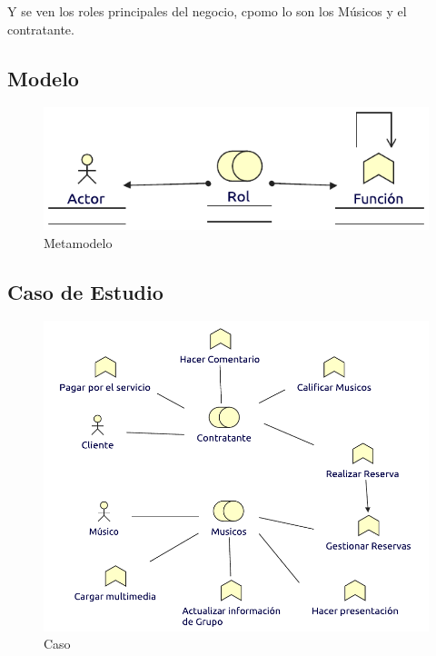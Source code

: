 Y se ven los roles principales del negocio, cpomo lo son los Músicos y el contratante. 

\subsection{Modelo}
\begin{figure}[h!]
	\centering
	\includegraphics[width=0.8\linewidth]{Arquitectura/Negocio/imgs/FuncionNegocioMetamodelo.pdf}
	\caption{Metamodelo}
\end{figure}
\newpage
\subsection{Caso de Estudio}

\begin{figure}[h!]
	\centering
	\includegraphics[width=\linewidth]{Arquitectura/Negocio/imgs/FuncionNegocio.pdf}
	\caption{Caso}
\end{figure}
\newpage

